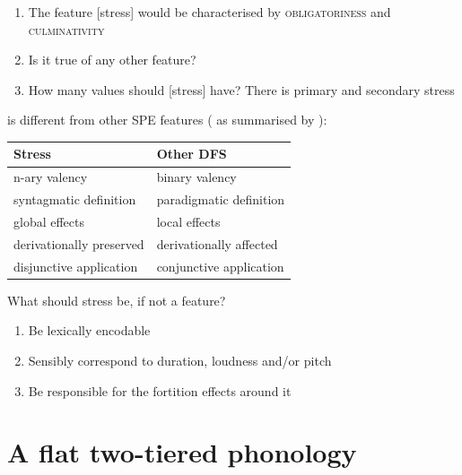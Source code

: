 \documentclass[a4paper, 12pt]{article}
\begin{document}
	\begin{enumerate}[$\gg$]
		\item The feature [stress] would be characterised by \textsc{obligatoriness} and \textsc{culminativity}
		\item Is it true of any other feature?
		\item How many values should [stress] have? There is primary and secondary stress
	\end{enumerate}
	
	\noindent [Stress] is different from other SPE features (\cite[pp. 262--263]{liberman-prince1977} as summarised by \cite[pp. 208]{roca1994}):
	
	\renewcommand{\arraystretch}{1.2}
\begin{table}[H]
\centering
\begin{tabular}{ll}
\toprule
Stress                   & Other DFS               \\
\midrule
n-ary valency            & binary valency          \\
syntagmatic definition   & paradigmatic definition \\
global effects           & local effects           \\
derivationally preserved & derivationally affected \\
disjunctive application  & conjunctive application \\
\bottomrule
\end{tabular}
\end{table}
	
	\noindent What should stress be, if not a feature?
	
	\begin{enumerate}[$\gg$]
		\item Be lexically encodable
		\item Sensibly correspond to duration, loudness and/or pitch
		\item Be responsible for the fortition effects around it
	\end{enumerate}
	

		\section{A flat two-tiered phonology}
		
\end{document}
